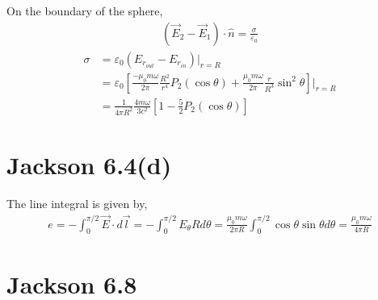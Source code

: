 \documentclass{article}
\begin{document}
On the boundary of the sphere,
\begin{align*}
  (\vec E_2-\vec E_1)\cdot\hat n=\frac{\sigma}{\varepsilon_0}
\end{align*}
\begin{align*}
  \sigma&=\varepsilon_0(E_{r_{out}}-E_{r_{in}})|_{r=R}\\
        &=\varepsilon_0[\frac{-\mu_0 m\omega}{2\pi}\frac{R^2}{r^4}P_2(\cos\theta)+\frac{\mu_0 m\omega}{2\pi}\frac{r}{R^3}\sin^2\theta]|_{r=R}\\
        &=\frac{1}{4\pi R^2}\frac{4m\omega}{3c^2}[1-\frac{5}{2}P_2(\cos\theta)]
\end{align*}

\section*{Jackson 6.4(d)}

The line integral is given by,
\begin{align*}
  e=-\int_0^{\pi/2}\vec E\cdot d\vec l=-\int_0^{\pi/2}E_{\theta}Rd\theta=\frac{\mu_0 m\omega}{2\pi R}\int_{0}^{\pi/2}\cos\theta\sin\theta d\theta=\frac{\mu_0 m\omega}{4\pi R}
\end{align*}
\pagebreak

\section*{Jackson 6.8}
\end{document}
